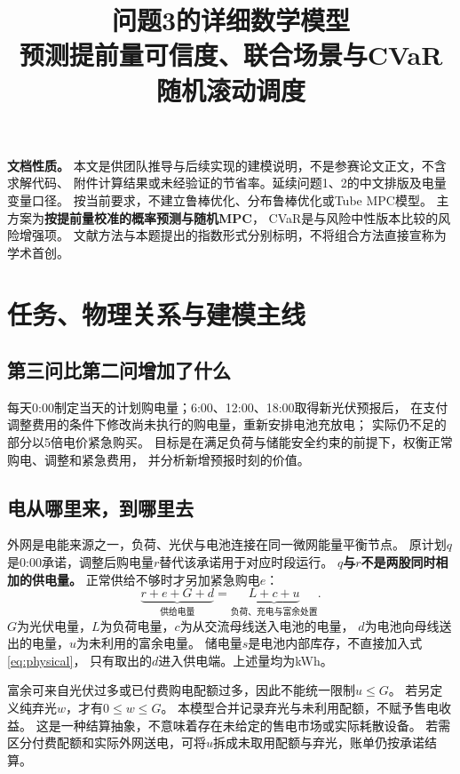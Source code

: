 \documentclass[UTF8,11pt]{ctexart}
\title{问题3的详细数学模型\\
{\large 预测提前量可信度、联合场景与CVaR随机滚动调度}}
\author{}
\date{}
\begin{document}
\maketitle

\noindent\textbf{文档性质。}
本文是供团队推导与后续实现的建模说明，不是参赛论文正文，不含求解代码、
附件计算结果或未经验证的节省率。延续问题1、2的中文排版及电量变量口径。
按当前要求，不建立鲁棒优化、分布鲁棒优化或Tube MPC模型。
主方案为\textbf{按提前量校准的概率预测与随机MPC}，
CVaR是与风险中性版本比较的风险增强项。
文献方法与本题提出的指数形式分别标明，不将组合方法直接宣称为学术首创。

\section{任务、物理关系与建模主线}
\subsection{第三问比第二问增加了什么}
每天0:00制定当天的计划购电量；6:00、12:00、18:00取得新光伏预报后，
在支付调整费用的条件下修改尚未执行的购电量，重新安排电池充放电；
实际仍不足的部分以5倍电价紧急购买。
目标是在满足负荷与储能安全约束的前提下，权衡正常购电、调整和紧急费用，
并分析新增预报时刻的价值。

\subsection{电从哪里来，到哪里去}
外网是电能来源之一，负荷、光伏与电池连接在同一微网能量平衡节点。
原计划$q$是0:00承诺，调整后购电量$r$替代该承诺用于对应时段运行。
\textbf{$q$与$r$不是两股同时相加的供电量。}
正常供给不够时才另加紧急购电$e$：
\begin{equation}\label{eq:physical}
 \underbrace{r+e+G+d}_{\text{供给电量}}
 =\underbrace{L+c+u}_{\text{负荷、充电与富余处置}} .
\end{equation}
$G$为光伏电量，$L$为负荷电量，$c$为从交流母线送入电池的电量，
$d$为电池向母线送出的电量，$u$为未利用的富余电量。
储电量$s$是电池内部库存，不直接加入式\eqref{eq:physical}，
只有取出的$d$进入供电端。上述量均为kWh。

富余可来自光伏过多或已付费购电配额过多，因此不能统一限制$u\leq G$。
若另定义纯弃光$w$，才有$0\leq w\leq G$。
本模型合并记录弃光与未利用配额，不赋予售电收益。
这是一种结算抽象，不意味着存在未给定的售电市场或实际耗散设备。
若需区分付费配额和实际外网送电，可将$u$拆成未取用配额与弃光，账单仍按承诺结算。
\end{document}
